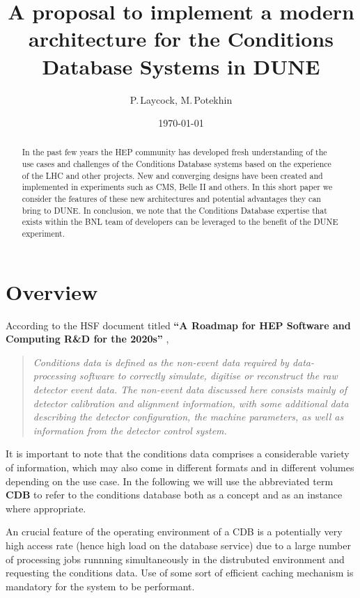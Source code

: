 \documentclass[pdftex,12pt,letter]{article}
\title{A proposal to implement a modern architecture for the Conditions Database Systems in DUNE}
\date{\today}
\author{P.\,Laycock, M.\,Potekhin}
\begin{document}
\maketitle

\begin{abstract}
\noindent  In the past few years the HEP community has developed fresh understanding of
the use cases and challenges of the Conditions Database systems based on the experience
of the LHC and other projects. New and converging designs have been created and
implemented in experiments such as CMS, Belle II and others. In this short paper we consider the features
of these new architectures and potential advantages they can bring to DUNE. In conclusion,
we note that the Conditions Database expertise that exists within the BNL team of developers
can be leveraged to the benefit of the DUNE experiment.

\end{abstract}


\section{Overview}
According to  the HSF document titled \textbf{``A Roadmap for HEP Software and Computing R\&D for the 2020s''} \cite{hsf_roadmap},
\begin{quote}
\textit{
Conditions data is defined as the non-event data required by data-processing software to correctly simulate,
digitise or reconstruct the raw detector event data. The non-event data discussed here consists mainly of
detector calibration and alignment information, with some additional data describing the detector configuration,
the machine parameters, as well as information from the detector control system.
}
\end{quote}
\noindent It is important to note that the conditions data comprises a considerable variety of information,
which may also come in different formats and in different volumes depending on the use case. In the following
we will use the abbreviated term \textbf{CDB } to refer to the conditions database both as a concept and as an
instance where appropriate.

An crucial feature of the operating environment of a CDB is a potentially very high access rate
(hence high load on the database service) due to a large
 number of processing jobs runnning simultaneously in the distrubuted environment and requesting the conditions
data. Use of some sort of efficient caching mechanism is mandatory for the system to be performant.
\end{document}

